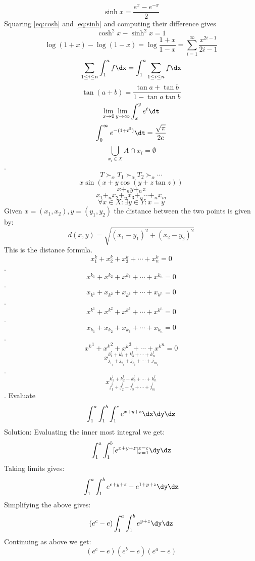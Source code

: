 \begin{equation}
\sinh x = \frac{e^x-e^{-x}}{2} \label{eq:sinh}
\end{equation}
Squaring  \ref{eq:cosh} and \ref{eq:sinh} and computing their
difference gives
$$\cosh^2x -\sinh^2 x = 1$$
$$\log (1+x) - \log (1-x) = \log \frac{1+x}{1-x} = \sum_{i=1}^\infty
\frac{x^{2i-1}}{2i -1}$$
$$\sum_{1 \leq i \leq n} \int_1^a f\dx = \int_1^a \sum_{1\leq i \leq n
} f \dx $$
$$\tan (a+b) =\frac{\tan a + \tan b}{  1 - \tan a \tan b}$$
$$\lim_{x\to0}\lim_{y\to\infty}\int_x^ye^t\dt$$
$$\int_0^\infty e^{-(1+t^2)} \dt = \frac{\sqrt{\pi}}{2e}$$
$$\bigcup_{x_i \in X} A\cap x_i = \emptyset$$.
$$T\succ_\alpha T_1 \succ_\alpha T_2 \succ_\alpha \cdots$$
$$x\sin(x+y\cos (y+z\tan z))$$
$$x +_n y +_n z$$
$$x_1 +_n x_2 +_n x_3 +_n \cdots +_n x_m$$
$$\forall x \in X:    \exists y \in Y :   x=y$$
Given $x=(x_1,x_2), y=(y_1,y_2)$ the distance between the two points
is given by: 
$$d(x,y) = \sqrt{(x_1-y_1)^2 +(x_2-y_2)^2} $$
This is the distance formula.
$$x^k_1 +x^k_2 + x^k_3 + \cdots + x^k_n = 0$$.
$$x^{k_1} + x^{k_2} + x^{k_3} + \cdots + x^{k_n} = 0$$.
$$x_{k^1}+x_{k^2}+x_{k^3}+\cdots+x_{k^n}=0$$.
$$x^{k^1}+x^{k^2}+x^{k^3}+\cdots+x^{k^n}=0$$.
$$x_{k_1}+x_{k_2}+x_{k_3}+\cdots+x_{k_n}=0$$.
$${x^k}^1 +{x^k}^2 +{x^k}^3 + \cdots + {x^k}^n = 0$$
$$x^{k_1^l+k_2^l+k_3^l+\cdots+k_n^l}_{j_{1_i}+j_{2_i}+j_{3_i}+\cdots+j_{m_i}}$$.
$$x^{k_1^l+k_2^l+k_3^l+\cdots+k_n^l}_{j_1^i+j_2^i+j_3^i+\cdots+j_m^i}$$. 
Evaluate
$$\int_1^a \int_1^b\int_1^c e^{x+y+z}\dx\dy\dz$$
Solution:
Evaluating the inner most integral we get:
$$\int_1^a \int_1^b[e^{x+y+z}]_{x=1}^{x=c}\dy\dz$$
Taking limits gives:
$$\int_1^a \int_1^be^{c+y+z}-e^{1+y+z}\dy\dz$$
Simplifying the above gives:
$$(e^c-e)\int_1^a\int_1^b e^{y+z}\dy\dz$$
Continuing as above we get:
$$(e^c-e)(e^b-e)(e^a-e)$$

